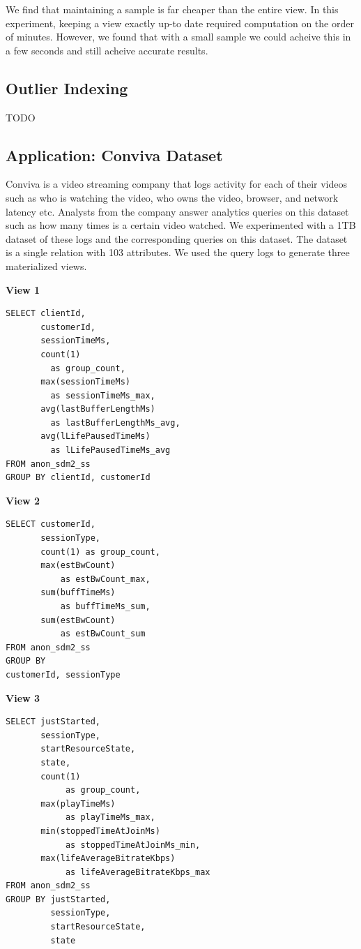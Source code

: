 We find that maintaining a sample is far cheaper than the entire view. In this experiment, keeping a view exactly up-to date required computation on the order of minutes.
However, we found that with a small sample we could acheive this in a few seconds and still acheive accurate results.

\subsection{Outlier Indexing}
TODO

\subsection{Application: Conviva Dataset}
Conviva is a video streaming company that logs activity for each of their videos such as who is watching the video, who owns the video, browser, and network latency etc. 
Analysts from the company answer analytics queries on this dataset such as how many times is a certain video watched.
We experimented with a 1TB dataset of these logs and the corresponding queries on this dataset.
The dataset is a single relation with 103 attributes.
We used the query logs to generate three materialized views.
\vspace{1em}

\textbf{View 1}
\begin{lstlisting}
SELECT clientId, 
       customerId, 
       sessionTimeMs, 
       count(1) 
         as group_count, 
       max(sessionTimeMs) 
         as sessionTimeMs_max, 
       avg(lastBufferLengthMs) 
         as lastBufferLengthMs_avg,
       avg(lLifePausedTimeMs) 
         as lLifePausedTimeMs_avg 
FROM anon_sdm2_ss 
GROUP BY clientId, customerId
\end{lstlisting}

\vspace{1em}

\textbf{View 2}
\begin{lstlisting}
SELECT customerId, 
       sessionType, 
       count(1) as group_count, 
       max(estBwCount) 
           as estBwCount_max, 
       sum(buffTimeMs) 
           as buffTimeMs_sum, 
       sum(estBwCount) 
           as estBwCount_sum 
FROM anon_sdm2_ss 
GROUP BY 
customerId, sessionType
\end{lstlisting}

\vspace{1em}

\textbf{View 3}
\begin{lstlisting}
SELECT justStarted, 
       sessionType, 
       startResourceState, 
       state, 
       count(1) 
            as group_count, 
       max(playTimeMs) 
            as playTimeMs_max, 
       min(stoppedTimeAtJoinMs) 
            as stoppedTimeAtJoinMs_min, 
       max(lifeAverageBitrateKbps) 
            as lifeAverageBitrateKbps_max 
FROM anon_sdm2_ss 
GROUP BY justStarted, 
         sessionType, 
         startResourceState, 
         state
\end{lstlisting}

